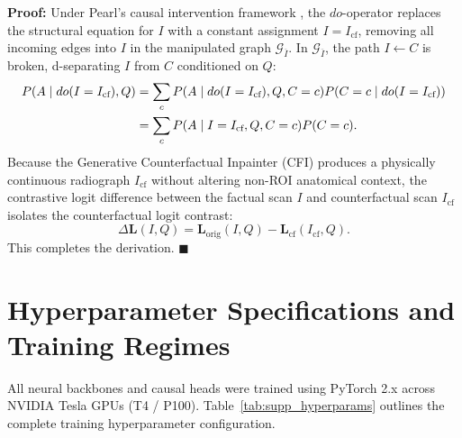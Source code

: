 \documentclass[journal,twocolumn,letterpaper]{IEEEtran}
\begin{document}
\noindent\textbf{Proof:} 
Under Pearl's causal intervention framework \cite{pearl2009}, the $do$-operator replaces the structural equation for $I$ with a constant assignment $I = I_{\text{cf}}$, removing all incoming edges into $I$ in the manipulated graph $\mathcal{G}_{\overline{I}}$. In $\mathcal{G}_{\overline{I}}$, the path $I \leftarrow C$ is broken, d-separating $I$ from $C$ conditioned on $Q$:
\begin{align}
P(A \mid do(I=I_{\text{cf}}), Q) &= \sum_{c} P(A \mid do(I=I_{\text{cf}}), Q, C=c) P(C=c \mid do(I=I_{\text{cf}})) \notag \\
&= \sum_{c} P(A \mid I=I_{\text{cf}}, Q, C=c) P(C=c).
\end{align}
Because the Generative Counterfactual Inpainter (CFI) produces a physically continuous radiograph $I_{\text{cf}}$ without altering non-ROI anatomical context, the contrastive logit difference between the factual scan $I$ and counterfactual scan $I_{\text{cf}}$ isolates the counterfactual logit contrast:
\begin{equation}
\Delta \mathbf{L}(I, Q) = \mathbf{L}_{\text{orig}}(I, Q) - \mathbf{L}_{\text{cf}}(I_{\text{cf}}, Q).
\end{equation}
This completes the derivation. $\blacksquare$

\section{Hyperparameter Specifications and Training Regimes}
\label{sec:hyperparameters}

All neural backbones and causal heads were trained using PyTorch 2.x across NVIDIA Tesla GPUs (T4 / P100). Table~\ref{tab:supp_hyperparams} outlines the complete training hyperparameter configuration.
\end{document}
